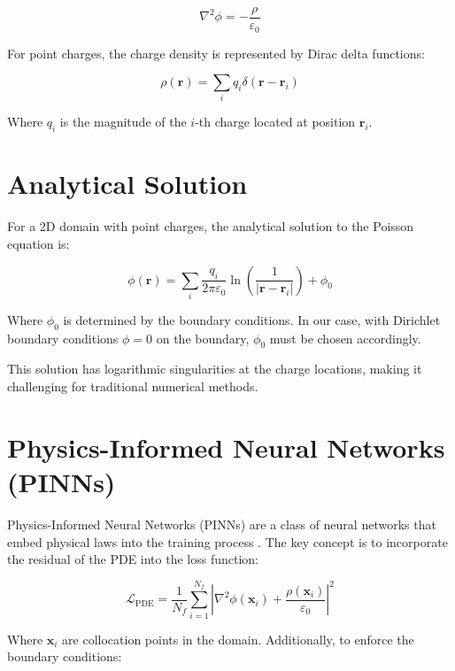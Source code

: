 \documentclass[12pt,a4paper]{report}
\begin{document}
	\begin{equation}
		\nabla^2 \phi = -\frac{\rho}{\varepsilon_0}
	\end{equation}
	
	For point charges, the charge density is represented by Dirac delta functions:
	
	\begin{equation}
		\rho(\mathbf{r}) = \sum_{i} q_i \delta(\mathbf{r} - \mathbf{r}_i)
	\end{equation}
	
	Where $q_i$ is the magnitude of the $i$-th charge located at position $\mathbf{r}_i$.
	
	\section{Analytical Solution}
	For a 2D domain with point charges, the analytical solution to the Poisson equation is:
	
	\begin{equation}
		\phi(\mathbf{r}) = \sum_{i} \frac{q_i}{2\pi\varepsilon_0} \ln\left(\frac{1}{|\mathbf{r} - \mathbf{r}_i|}\right) + \phi_0
	\end{equation}
	
	Where $\phi_0$ is determined by the boundary conditions. In our case, with Dirichlet boundary conditions $\phi = 0$ on the boundary, $\phi_0$ must be chosen accordingly.
	
	This solution has logarithmic singularities at the charge locations, making it challenging for traditional numerical methods.
	
	\section{Physics-Informed Neural Networks (PINNs)}
	Physics-Informed Neural Networks (PINNs) are a class of neural networks that embed physical laws into the training process \cite{raissi2019physics, wang2020understanding}. The key concept is to incorporate the residual of the PDE into the loss function:
	
	\begin{equation}
		\mathcal{L}_{\text{PDE}} = \frac{1}{N_f} \sum_{i=1}^{N_f} \left| \nabla^2 \phi(\mathbf{x}_i) + \frac{\rho(\mathbf{x}_i)}{\varepsilon_0} \right|^2
	\end{equation}
	
	Where $\mathbf{x}_i$ are collocation points in the domain. Additionally, to enforce the boundary conditions:
	
\end{document}
